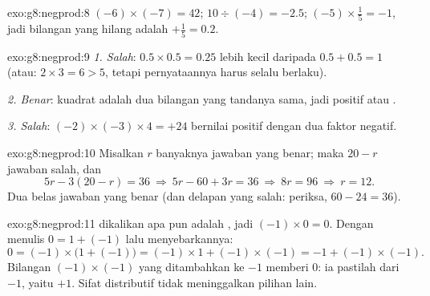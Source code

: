 \begin{solution}{exo:g8:negprod:8}
$(-6) \times (-7) = 42$; \quad
$10 \div (-4) = -2.5$; \quad
$(-5) \times \frac15 = -1$, jadi bilangan yang hilang adalah
$+\frac15 = 0.2$.
\end{solution}

\begin{solution}{exo:g8:negprod:9}
\emph{1. Salah}: $0.5 \times 0.5 = 0.25$ lebih kecil daripada
$0.5 + 0.5 = 1$ (atau: $2 \times 3 = 6 > 5$, tetapi pernyataannya
harus selalu berlaku).

\emph{2. Benar}: kuadrat adalah  dua bilangan yang tandanya
sama, jadi positif atau .

\emph{3. Salah}: $(-2) \times (-3) \times 4 = +24$ bernilai positif
dengan dua faktor negatif.
\end{solution}

\begin{solution}{exo:g8:negprod:10}
Misalkan $r$ banyaknya jawaban yang benar; maka $20 - r$ jawaban salah, dan
\[
5r - 3(20 - r) = 36
\ \Longrightarrow\
5r - 60 + 3r = 36
\ \Longrightarrow\
8r = 96
\ \Longrightarrow\
r = 12 .
\]
Dua belas jawaban yang benar (dan delapan yang salah: periksa,
$60 - 24 = 36$).
\end{solution}

\begin{solution}{exo:g8:negprod:11}
 dikalikan apa pun adalah , jadi $(-1) \times 0 = 0$. Dengan
menulis $0 = 1 + (-1)$ lalu menyebarkannya:
\[
0 = (-1) \times \bigl(1 + (-1)\bigr)
= (-1) \times 1 + (-1) \times (-1)
= -1 + (-1) \times (-1).
\]
Bilangan $(-1) \times (-1)$ yang ditambahkan ke $-1$ memberi $0$: ia
pastilah  dari $-1$, yaitu $+1$. Sifat distributif tidak
meninggalkan pilihan lain.
\end{solution}

